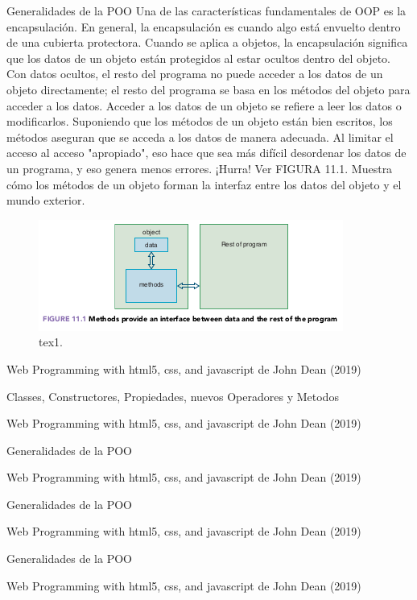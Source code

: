 \begin{frame}{Generalidades de la POO}
\justifying
Una de las características fundamentales de OOP es la encapsulación. En general, la encapsulación es cuando algo está envuelto dentro de una cubierta protectora. Cuando se aplica a objetos, la encapsulación significa que los datos de un objeto están protegidos al estar ocultos dentro del objeto. Con datos ocultos, el resto del programa no puede acceder a los datos de un objeto directamente; el resto del programa se basa en los métodos del objeto para acceder a los datos. Acceder a los datos de un objeto se refiere a leer los datos o modificarlos. Suponiendo que los métodos de un objeto están bien escritos, los métodos aseguran que se acceda a los datos de manera adecuada. Al limitar el acceso al acceso "apropiado", eso hace que sea más difícil desordenar los datos de un programa, y eso genera menos errores. ¡Hurra! Ver FIGURA 11.1. Muestra cómo los métodos de un objeto forman la interfaz entre los datos del objeto
y el mundo exterior.

\begin{figure}
\centering
\includegraphics[scale=0.3]{Section_Files/images/Sec04/01.png}
\caption{tex1.}
\end{figure}

{\tiny Web Programming with html5, css, and javascript de John Dean (2019)}
\end{frame}

\begin{frame}{Classes, Constructores, Propiedades, nuevos
Operadores y Metodos}
\justifying



{\tiny Web Programming with html5, css, and javascript de John Dean (2019)}
\end{frame}

\begin{frame}{Generalidades de la POO}
\justifying



{\tiny Web Programming with html5, css, and javascript de John Dean (2019)}
\end{frame}

\begin{frame}{Generalidades de la POO}
\justifying



{\tiny Web Programming with html5, css, and javascript de John Dean (2019)}
\end{frame}

\begin{frame}{Generalidades de la POO}
\justifying



{\tiny Web Programming with html5, css, and javascript de John Dean (2019)}
\end{frame}